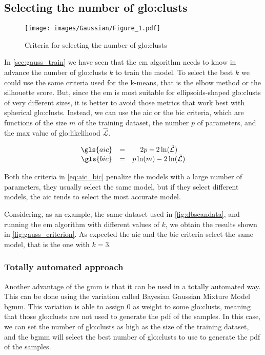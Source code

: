 \subsection{Selecting the number of \gls{glo:clust}s}
\begin{figure}[htbp]
    \centering
    \texttt{[image: images/Gaussian/Figure\_1.pdf]}
    \caption{Criteria for selecting the number of \gls{glo:clust}s}
    \label{fig:gauss_criterion}
\end{figure}
In \autoref{sec:gauss_train} we have seen that the \gls{em} algorithm needs to know in advance the number of \gls{glo:clust}s $k$ to train the model. To select the best $k$ we could use the same criteria used for the k-means, that is the elbow method or the silhouette score. But, since the \gls{em} is most suitable for ellipsoids-shaped \gls{glo:clust}s of very different sizes, it is better to avoid those metrics that work best with spherical \gls{glo:clust}s. Instead, we can use the \gls{aic} or the \gls{bic} criteria, which are functions of the size $m$ of the training dataset, the number $p$ of parameters, and the max value of \gls{glo:likelihood} $\hat{\mathcal{L}}$.

\begin{equation}
    \begin{matrix}
        \gls{aic} &=& 2p - 2 \ln(\hat{\mathcal{L}}) \\
        \gls{bic} &=& p \ln(m) - 2 \ln(\hat{\mathcal{L}})
    \end{matrix}
    \label{eq:aic_bic}
\end{equation}

Both the criteria in \autoref{eq:aic_bic} penalize the models with a large number of parameters, they usually select the same model, but if they select different models, the \gls{aic} tends to select the most accurate model.

Considering, as an example, the same dataset used in \autoref{fig:dbscandata}, and running the \gls{em} algorithm with different values of $k$, we obtain the results shown in \autoref{fig:gauss_criterion}. As expected the \gls{aic} and the \gls{bic} criteria select the same model, that is the one with $k=3$.

\subsubsection{Totally automated approach}
\label{sec:gauss_unsupervised}
Another advantage of the \gls{gmm} is that it can be used in a totally automated way. This can be done using the variation called Bayesian Gaussian Mixture Model \gls{bgmm}. This variation is able to assign $0$ as 
weight to some \gls{glo:clust}s, meaning that those \gls{glo:clust}s are not used to generate the \gls{pdf} of the samples. In this case, we can set the number of \gls{glo:clust}s as high as the size of the training dataset, and the \gls{bgmm} will select the best number of \gls{glo:clust}s to use to generate the \gls{pdf} of the samples. 

